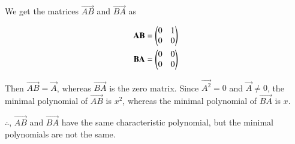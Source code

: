 \documentclass[journal,12pt,twocolumn]{IEEEtran}
\begin{document}
	We get the matrices $\vec{AB}$ and $\vec{BA}$ as
	
	\begin{align}
		\mathbf{AB} = \begin{pmatrix}0&1\\0&0\end{pmatrix} \\
		\mathbf{BA} = \begin{pmatrix}0&0\\0&0\end{pmatrix}
	\end{align}

	Then $\vec{AB} = \vec{A}$, whereas $\vec{BA}$ is the zero matrix. Since $\vec{A^2} = 0$ and $\vec{A} \neq 0$, the minimal polynomial of $\vec{AB}$ is $x^2$, whereas the minimal polynomial of $\vec{BA}$ is $x$.
	
	$\therefore$, $\vec{AB}$ and $\vec{BA}$ have the same characteristic polynomial, but the minimal polynomials are not the same.
	
	
\end{document}
